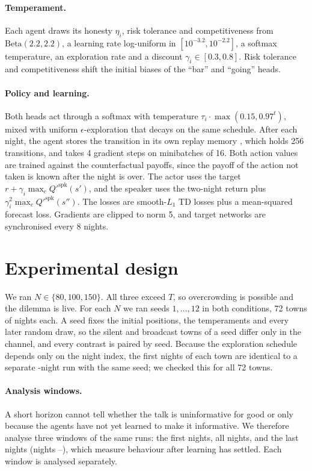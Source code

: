 \documentclass[11pt]{article}
\begin{document}
\paragraph{Temperament.} Each agent draws its honesty $\eta_i$, risk tolerance and competitiveness from $\mathrm{Beta}(2.2, 2.2)$, a learning rate log-uniform in $[10^{-3.2}, 10^{-2.2}]$, a softmax temperature, an exploration rate and a discount $\gamma_i \in [0.3, 0.8]$. Risk tolerance and competitiveness shift the initial biases of the ``bar'' and ``going'' heads.

\paragraph{Policy and learning.} Both heads act through a softmax with temperature $\tau_i \cdot \max(0.15, 0.97^t)$, mixed with uniform $\epsilon$-exploration that decays on the same schedule. After each night, the agent stores the transition in its own replay memory \citep{lin1992}, which holds 256 transitions, and takes 4 gradient steps on minibatches of 16. Both action values are trained against the counterfactual payoffs, since the payoff of the action not taken is known after the night is over. The actor uses the target $r + \gamma_i \max_c Q'^{\text{spk}}(s')$, and the speaker uses the two-night return plus $\gamma_i^2 \max_c Q'^{\text{spk}}(s'')$. The losses are smooth-$L_1$ TD losses plus a mean-squared forecast loss. Gradients are clipped to norm 5, and target networks are synchronised every 8 nights.

\section{Experimental design}\label{sec:design}

We ran $N \in \{80, 100, 150\}$. All three exceed $T$, so overcrowding is possible and the dilemma is live. For each $N$ we ran seeds $1, \dots, 12$ in both conditions, 72 towns of \rnightsLong{} nights each. A seed fixes the initial positions, the temperaments and every later random draw, so the silent and broadcast towns of a seed differ only in the channel, and every contrast is paired by seed. Because the exploration schedule depends only on the night index, the first \rnightsShort{} nights of each town are identical to a separate \rnightsShort-night run with the same seed; we checked this for all 72 towns.

\paragraph{Analysis windows.} A short horizon cannot tell whether the talk is uninformative for good or only because the agents have not yet learned to make it informative. We therefore analyse three windows of the same runs: the first \rnightsShort{} nights, all \rnightsLong{} nights, and the last \rnightsLate{} nights (nights \rlateStart--\rnightsLong), which measure behaviour after learning has settled. Each window is analysed separately.
\end{document}
